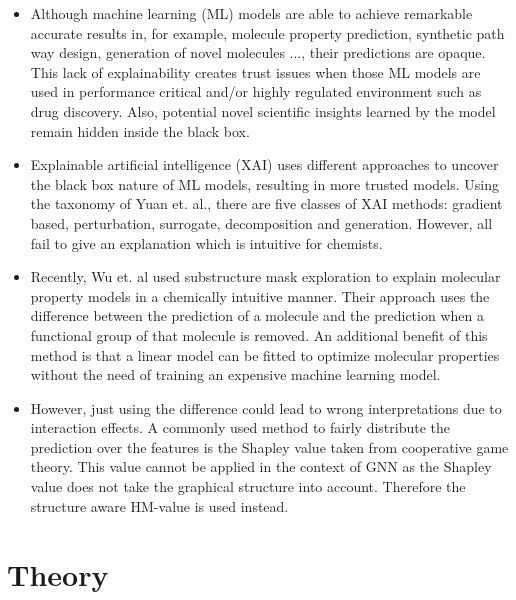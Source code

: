 \documentclass[twoside,twocolumn,9pt]{article}
\begin{document}
\begin{itemize}

    \item Although machine learning (ML) models are able to achieve remarkable accurate results in,
        for example, molecule property prediction\cite{}, synthetic path way design\cite{}, 
        generation of novel molecules\cite{} ..., their predictions are opaque.\cite{} This lack 
        of explainability creates trust issues when those ML models are used in performance critical 
        and/or highly regulated environment such as drug discovery.\cite{} Also, potential novel 
        scientific insights learned by the model remain hidden inside the black box.\cite{}

	\item Explainable artificial intelligence (XAI) uses different approaches to uncover the black 
        box nature of ML models, resulting in more trusted models.\cite{} Using the taxonomy of 
        Yuan et. al., there are five classes of XAI methods: gradient based, perturbation, surrogate, 
        decomposition and generation.\cite{} However, all fail to give an explanation which is 
        intuitive for chemists.

    \item Recently, Wu et. al used substructure mask exploration to explain molecular property models 
        in a chemically intuitive manner.\cite{} Their approach uses the difference between the prediction
	      of a molecule and the prediction when a functional group of that molecule is removed.
	      An additional benefit of this method is that a linear model can be fitted to optimize
	      molecular properties without the need of training an expensive machine learning model.

	\item However, just using the difference could lead to wrong interpretations due to interaction
	      effects.\cite{} A commonly used method to fairly distribute the prediction over the
	      features is the Shapley value taken from cooperative game theory.\cite{} This value cannot
	      be applied in the context of GNN as the Shapley value does not take the graphical structure
	      into account. Therefore the structure aware HM-value is used instead.\cite{}
\end{itemize}


\section{Theory}
\end{document}
